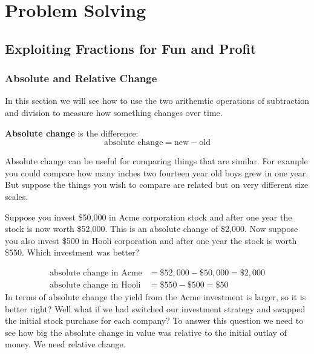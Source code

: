 \chapter{Problem Solving}%
\label{chap:problem-solving}

\section{Exploiting Fractions for Fun and Profit}
\label{sec:proportions-rates}

\subsection{Absolute and Relative Change}
\label{sub:absolute-relative-change}

In this section we will see how to use the two arithemtic operations
of subtraction and division to measure how something changes over
time.
\begin{definition}
  \textbf{Absolute change} is the difference:
  \[
    \text{absolute change} = \text{new} - \text{old}
  \]
\end{definition}

Absolute change can be useful for comparing things that are similar.
For example you could compare how many inches two fourteen year old
boys grew in one year. But suppose the things you wish to compare are
related but on very different size scales.

\begin{example}
  Suppose you invest \$50,000 in Acme corporation stock and after one
  year the stock is now worth \$52,000. This is an absolute change of
  \$2,000. Now suppose you also invest \$500 in Hooli corporation and
  after one year the stock is worth \$550. Which investment was better?
\end{example}
\begin{solution}
  \begin{align*}
    \text{absolute change in Acme} &= \$52,000 - \$50,000 = \$2,000 \\
    \text{absolute change in Hooli} &= \$550 - \$500 = \$50
  \end{align*}
  In terms of absolute change the yield from the Acme investment is
  larger, so it is better right? Well what if we had switched our
  investment strategy and swapped the initial stock purchase for each
  company? To answer this question we need to see how big the absolute
  change in value was relative to the initial outlay of money. We need
  relative change.
\end{solution}

